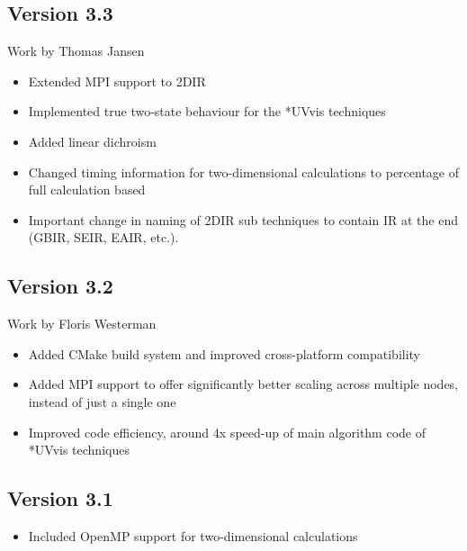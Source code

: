 \subsection{Version 3.3}
{\small Work by Thomas Jansen}
\begin{itemize}
\item Extended MPI support to 2DIR
\item Implemented true two-state behaviour for the *UVvis techniques
\item Added linear dichroism
\item Changed timing information for two-dimensional calculations to percentage of full calculation based
\item Important change in naming of 2DIR sub techniques to contain IR at the end (GBIR, SEIR, EAIR, etc.).
\end{itemize}
	\subsection{Version 3.2}
{\small Work by Floris Westerman}
\begin{itemize}
\item Added CMake build system and improved cross-platform compatibility
\item Added MPI support to offer significantly better scaling across multiple nodes, instead of just a single one
\item Improved code efficiency, around 4x speed-up of main algorithm code of *UVvis techniques
\end{itemize}

\subsection{Version 3.1}
\begin{itemize}
\item Included OpenMP support for two-dimensional calculations
\end{itemize}